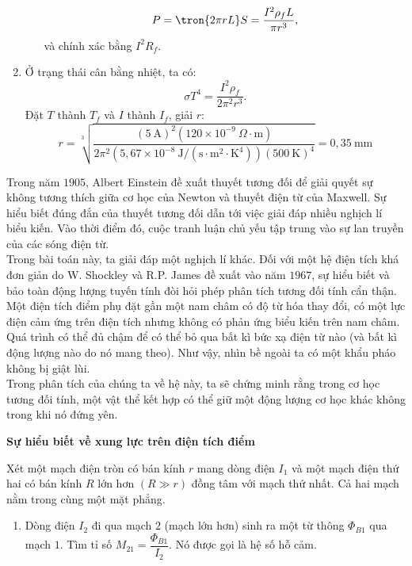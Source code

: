 \begin{loigiai}
\begin{enumerate}[1]
\begin{enumerate}[a)]
        $$P=\tron{2\pi rL}S=\dfrac{I^2\rho_f L}{\pi r^3},$$
        và chính xác bằng $I^2 R_f$.
        \end{enumerate}
        \item Ở trạng thái cân bằng nhiệt, ta có: 
        $$\sigma T^4=\dfrac{I^2\rho_f}{2\pi^2r^3}.$$
        Đặt $T$ thành $T_f$ và $I$ thành $I_f$, giải $r$:
        $$
r=\sqrt[3]{\dfrac{(5 \ \mathrm{A})^{2}\left(120 \times 10^{-9}\ \Omega \cdot \mathrm{m}\right)}{2 \pi^{2}\left(5,67 \times 10^{-8} \ \mathrm{J} /\left(\mathrm{s} \cdot \mathrm{m}^{2} \cdot \mathrm{K}^{4}\right)\right)(500\  \mathrm{K})^{4}}}=0,35\ \mathrm{mm}
$$
\end{enumerate}
\end{loigiai}


\begin{vd} 
Trong năm $1905$, Albert Einstein đề xuất thuyết tương đối để giải quyết sự không tương thích giữa cơ học của Newton và thuyết điện từ của Maxwell. Sự hiểu biết đúng đắn của thuyết tương đối dẫn tới việc giải đáp nhiều nghịch lí biểu kiến. Vào thời điểm đó, cuộc tranh luận chủ yếu tập trung vào sự lan truyền của các sóng điện từ.\\
Trong bài toán này, ta giải đáp một nghịch lí khác. Đối với một hệ điện tích khá đơn giản do W. Shockley và R.P. James đề xuất vào năm $1967$, sự hiểu biết và bảo toàn động lượng tuyến tính đòi hỏi phép phân tích tương đối tính cẩn thận. Một điện tích điểm phụ đặt gần một nam châm có độ từ hóa thay đổi, có một lực điện cảm ứng trên điện tích nhưng không có phản ứng biểu kiến trên nam châm. Quá trình có thể đủ chậm để có thể bỏ qua bất kì bức xạ điện từ nào (và bất kì động lượng nào do nó mang theo). Như vậy, nhìn bề ngoài ta có một khẩu pháo không bị giật lùi.\\
Trong phân tích của chúng ta về hệ này, ta sẽ chứng minh rằng trong cơ học tương đối tính, một vật thể kết hợp có thể giữ một động lượng cơ học khác không trong khi nó đứng yên.
\begin{center}
    \bf Sự hiểu biết về xung lực trên điện tích điểm
\end{center}
Xét một mạch điện tròn có bán kính $r$ mang dòng điện $I_1$ và một mạch điện thứ hai có bán kính $R$ lớn hơn $(R\gg r)$ đồng tâm với mạch thứ nhất. Cả hai mạch nằm trong cùng một mặt phẳng.
\begin{enumerate}[1)]
    \item Dòng điện $I_2$ đi qua mạch $2$ (mạch lớn hơn) sinh ra một từ thông $\Phi_{B1}$ qua mạch $1$. Tìm tỉ số $M_{21}=\dfrac{\Phi_{B1}}{I_2}$. Nó được gọi là hệ số hỗ cảm. 

\end{enumerate}
\end{vd}
